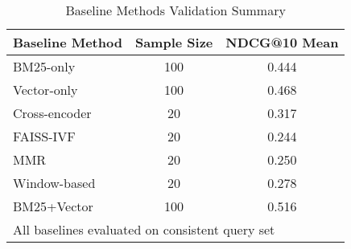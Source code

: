 \begin{table}[htbp]
\centering
\caption{Baseline Methods Validation Summary}
\label{tab:baseline-validation}
\begin{tabular}{lcc}
\toprule
Baseline Method & Sample Size & NDCG@10 Mean \\
\midrule
BM25-only & 100 & 0.444 \\
Vector-only & 100 & 0.468 \\
Cross-encoder & 20 & 0.317 \\
FAISS-IVF & 20 & 0.244 \\
MMR & 20 & 0.250 \\
Window-based & 20 & 0.278 \\
BM25+Vector & 100 & 0.516 \\
\bottomrule
\multicolumn{3}{l}{\small All baselines evaluated on consistent query set} \\
\end{tabular}
\end{table}
